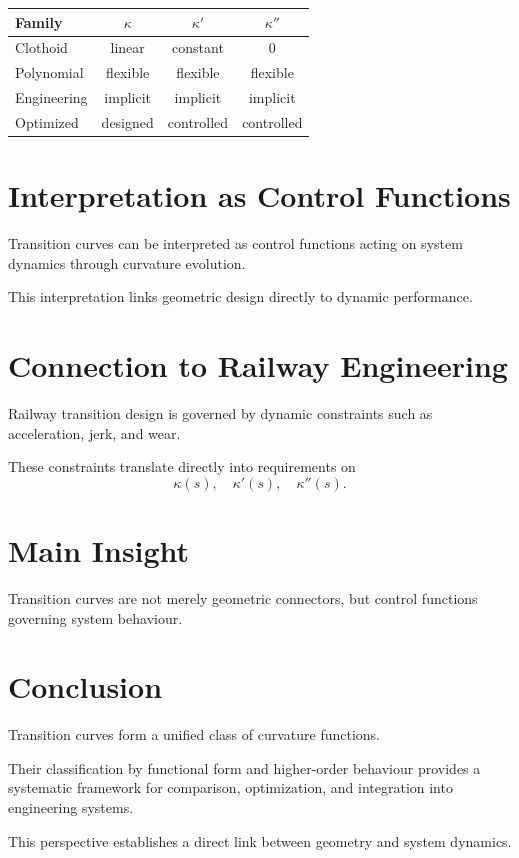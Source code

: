 \begin{center}
\begin{tabular}{lccc}
\textbf{Family} & $\kappa$ & $\kappa'$ & $\kappa''$ \\
\hline
Clothoid & linear & constant & 0 \\
Polynomial & flexible & flexible & flexible \\
Engineering & implicit & implicit & implicit \\
Optimized & designed & controlled & controlled \\
\end{tabular}
\end{center}


\section{Interpretation as Control Functions}

\begin{proposition}
Transition curves can be interpreted as control functions acting on
system dynamics through curvature evolution.
\end{proposition}

This interpretation links geometric design directly to dynamic
performance.


\section{Connection to Railway Engineering}

Railway transition design is governed by dynamic constraints such as
acceleration, jerk, and wear.

These constraints translate directly into requirements on
\[
\kappa(s), \quad \kappa'(s), \quad \kappa''(s).
\]


\section{Main Insight}

\begin{theorem}
Transition curves are not merely geometric connectors, but control
functions governing system behaviour.
\end{theorem}


\section{Conclusion}

\begin{summary}
Transition curves form a unified class of curvature functions.

Their classification by functional form and higher-order behaviour
provides a systematic framework for comparison, optimization, and
integration into engineering systems.

This perspective establishes a direct link between geometry and system
dynamics.
\end{summary}
